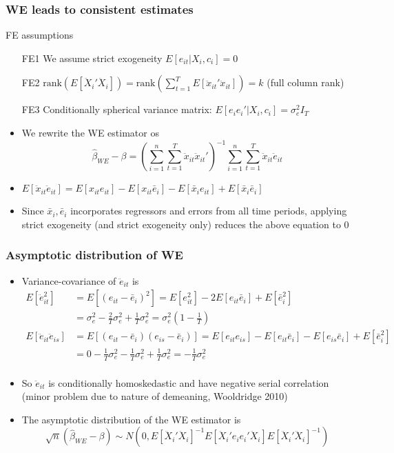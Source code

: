 \documentclass[aspectratio=169]{beamer}
\begin{document}
\begin{frame}
\frametitle{WE leads to consistent estimates}
\begin{block}{FE assumptions}
\begin{itemize}
\item[FE1] We assume strict exogeneity $E[e_{it}|X_i,c_i]=0$
\item[FE2] $\text{rank}\left(E [\ddot{X}_i' \ddot{X}_i]\right)=\text{rank}\left(\sum_{t=1}^T E [\ddot{x}_{it}' \ddot{x}_{it}]\right)=k$ (full column rank)
\item[FE3] Conditionally spherical variance matrix: $E[e_ie_i'|X_i,c_i]=\sigma_e^2 I_T$
\end{itemize}
\end{block}
\begin{itemize}
\item  We rewrite the WE estimator os 
\[
\hat{\beta}_{WE}-\beta=\left(\sum_{i=1}^n\sum_{t=1}^T \ddot{x}_{it}\ddot{x}_{it}'\right)^{-1}\sum_{i=1}^n\sum_{t=1}^T \ddot{x}_{it}\ddot{e}_{it}
\]
\item $E[\ddot{x}_{it}\ddot{e}_{it}]=E[x_{it}e_{it}]-E[x_{it}\bar{e}_i]-E[\bar{x}_ie_{it}]+E[\bar{x}_i\bar{e}_i]$
\item Since $\bar{x}_i, \bar{e}_i$ incorporates regressors and errors from all time periods, applying strict exogeneity (and strict exogeneity only) reduces the above equation to 0
\end{itemize}
\end{frame}

\begin{frame}
\frametitle{Asymptotic distribution of WE}
\begin{itemize}
\item Variance-covariance of $\ddot{e}_{it}$ is
\[
\begin{aligned}
E[\ddot{e}_{it}^2]&=E[(e_{it}-\bar{e}_i)^2]=E[e_{it}^2]-2E[e_{it}\bar{e}_i]+E[\bar{e}_i^2]\\
&=\sigma_e^2-\frac{2}{T}\sigma_e^2+\frac{1}{T}\sigma_e^2=\sigma_e^2\left(1-\frac{1}{T}\right)\\
E[\ddot{e}_{it}\ddot{e}_{is}]&=E[(e_{it}-\bar{e}_i)(e_{is}-\bar{e}_i)]=E[e_{it}e_{is}]-E[e_{it}\bar{e}_i]-E[e_{is}\bar{e}_i]+E[\bar{e}_i^2]\\
&=0-\frac{1}{T}\sigma_e^2-\frac{1}{T}\sigma_e^2+\frac{1}{T}\sigma_e^2=-\frac{1}{T}\sigma_e^2\\
\end{aligned}
\]
\item So $\ddot{e}_{it}$ is conditionally homoskedastic and have negative serial correlation (minor problem due to nature of demeaning, Wooldridge 2010)
\item  The asymptotic distribution of the WE estimator is
\[
\sqrt{n}(\hat{\beta}_{WE}-\beta)\sim N(0,E[\ddot{X}_i'\ddot{X}_i]^{-1}E[\ddot{X}_i'e_{i}e_{i}'\ddot{X}_i]E[\ddot{X}_i'\ddot{X}_i]^{-1})
\]
\end{itemize}
\end{frame}
\end{document}
